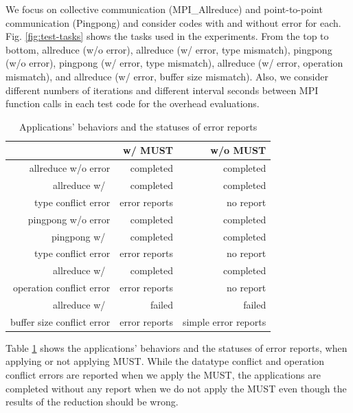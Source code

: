 \documentclass[graybox]{svmult}
\begin{document}
We focus on collective communication (MPI\_Allreduce) and point-to-point communication (Pingpong) and consider codes with and without error for each. 
Fig. \ref{fig:test-tasks} shows the tasks used in the experiments. 
From the top to bottom, allreduce (w/o error), allreduce (w/ error, type mismatch), pingpong (w/o error), pingpong (w/ error, type mismatch), allreduce (w/ error, operation mismatch), and allreduce (w/ error, buffer size mismatch). 
Also, we consider different numbers of iterations and different interval seconds between MPI function calls in each test code for the overhead evaluations. 

\begin{table}[t]
\caption{Applications' behaviors and the statuses of error reports}
\label{table:stats}
 \begin{center}
  \begin{tabular}[t]{|r|r|r|}\hline\hline
   & w/ MUST & w/o MUST \\\hline
  allreduce w/o error & completed & completed \\\hline
  allreduce w/~ & completed & completed \\
  type conflict error &  error reports & no report\\\hline
  pingpong w/o error & completed & completed \\\hline
  pingpong w/~ & completed & completed \\
  type conflict error &  error reports &  no report\\\hline
  allreduce w/~ & completed & completed \\
  operation conflict error &  error reports &  no report\\\hline
  allreduce w/~ & failed & failed \\
  buffer size conflict error & error reports  & simple error reports \\\hline
  \end{tabular}
 \end{center}
\end{table}

Table \ref{table:stats} shows the applications' behaviors and the statuses of error reports, when applying or not applying MUST.
While the datatype conflict and operation conflict errors are reported when we apply the MUST, the applications are completed without any report when we do not apply the MUST even though the results of the reduction should be wrong. 
\end{document}
